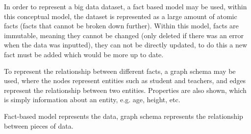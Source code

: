 In order to represent a big data dataset, a fact based model may be used, within this conceptual model, the dataset is represented as a large amount of atomic facts (facts that cannot be broken down further). Within this model, facts are immutable, meaning they cannot be changed (only deleted if there was an error when the data was inputted), they can not be directly updated, to do this a new fact must be added which would be more up to date.

To represent the relationship between different facts, a graph schema may be used, where the nodes represent entities such as student and teachers, and edges represent the relationship between two entities. Properties are also shown, which is simply information about an entity, e.g. age, height, etc.

Fact-based model represents the data, graph schema represents the relationship between pieces of data.

